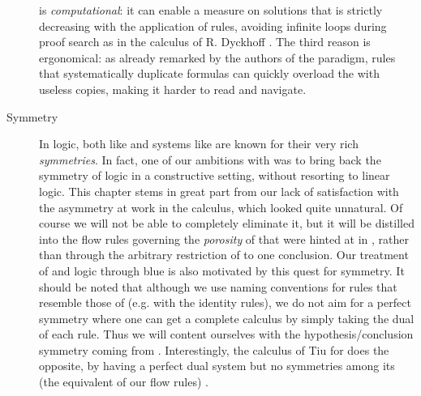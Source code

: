 \begin{description}
    is \emph{computational}: it can enable a measure on solutions that is
    strictly decreasing with the application of rules, avoiding infinite loops
    during proof search as in the calculus  of R. Dyckhoff
    \cite{dyckhoff_contraction-free_1992}. The third reason is ergonomical: as
    already remarked by the authors of the 
    paradigm, rules that systematically
    duplicate formulas can quickly overload the  with useless copies, making
    it harder to read and navigate.
  \item[Symmetry] 
    In  logic, both  like  and  systems like  are known for their very rich
    \emph{symmetries}. In fact, one of our ambitions with  was to bring
    back the symmetry of  logic in a constructive setting, without
    resorting to linear logic. This chapter stems in great part from our lack of
    satisfaction with the asymmetry at work in the  calculus, which
    looked quite unnatural. Of course we will not be able to completely
    eliminate it, but it will be distilled into the flow rules governing the
    \emph{porosity} of  that were hinted at in , rather
    than through the arbitrary restriction of  to one
    conclusion. Our
    treatment of  and  logic
    through blue  is also motivated by this quest for symmetry. It should
    be noted that although we use naming conventions for rules that resemble
    those of  (e.g. with the identity rules), we do not aim for a
    perfect symmetry where one can get a complete calculus by simply taking the
    dual of each rule.
    Thus we will content ourselves with the hypothesis/conclusion symmetry
    coming from . Interestingly, the calculus  of Tiu
    for   does the opposite, by having a perfect
    dual system  but no symmetries among its  (the
    equivalent of our flow rules) \cite{tiu_local_2006}.
\end{description}


